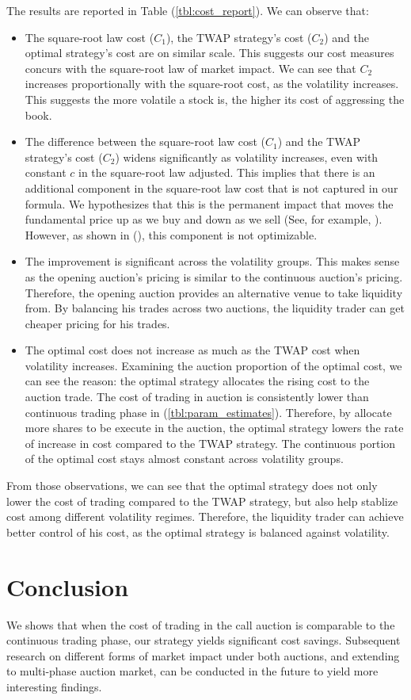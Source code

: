 The results are reported in Table (\ref{tbl:cost_report}). We can observe that:
\begin{itemize}
  \item The square-root law cost ($C_1$), the TWAP strategy's cost ($C_2$) and the optimal strategy's cost are on similar scale. This suggests our cost measures concurs with the square-root law of market impact. We can see that $C_2$ increases proportionally with the square-root cost, as the volatility increases. This suggests the more volatile a stock is, the higher its cost of aggressing the book.
  \item The difference between the square-root law cost ($C_1$) and the TWAP strategy's cost ($C_2$) widens significantly as volatility increases, even with constant $c$ in the square-root law adjusted. This implies that there is an additional component in the square-root law cost that is not captured in our formula. We hypothesizes that this is the permanent impact that moves the fundamental price up as we buy and down as we sell (See, for example, \cite{Kyle1985}). However, as shown in (\cite{Almgren2000}), this component is not optimizable.
  \item The improvement is significant across the volatility groups. This makes sense as the opening auction's pricing is similar to the continuous auction's pricing. Therefore, the opening auction provides an alternative venue to take liquidity from. By balancing his trades across two auctions, the liquidity trader can get cheaper pricing for his trades. 
  \item The optimal cost does not increase as much as the TWAP cost when volatility increases. Examining the auction proportion of the optimal cost, we can see the reason: the optimal strategy allocates the rising cost to the auction trade. The cost of trading in auction is consistently lower than continuous trading phase in (\ref{tbl:param_estimates}). Therefore, by allocate more shares to be execute in the auction, the optimal strategy lowers the rate of increase in cost compared to the TWAP strategy. The continuous portion of the optimal cost stays almost constant across volatility groups.
\end{itemize}

From those observations, we can see that the optimal strategy does not only lower the cost of trading compared to the TWAP strategy, but also help stablize cost among different volatility regimes. Therefore, the liquidity trader can achieve better control of his cost, as the optimal strategy is balanced against volatility.



\section{Conclusion}\label{secConclusionAuction}
We shows that when the cost of trading in the call auction is comparable to the continuous trading phase, our strategy yields significant cost savings. Subsequent research on different forms of market impact under both auctions, and extending to multi-phase auction market, can be conducted in the future to yield more interesting findings.
